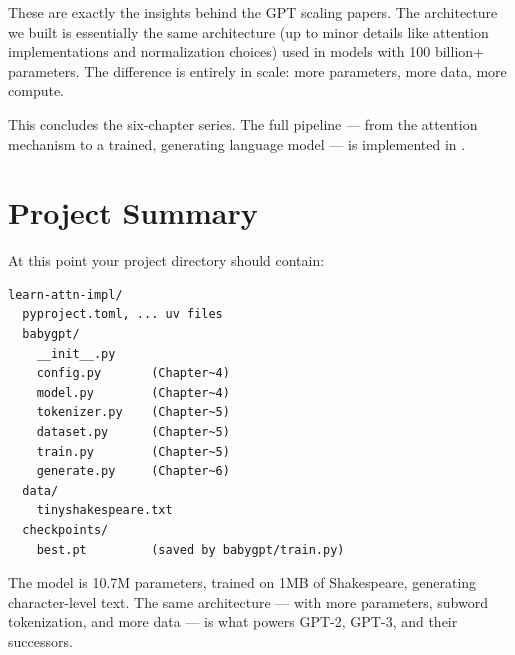 These are exactly the insights behind the GPT scaling papers. The architecture we built is essentially the same architecture (up to minor details like attention implementations and normalization choices) used in models with 100 billion+ parameters. The difference is entirely in scale: more parameters, more data, more compute.

\bigskip

This concludes the six-chapter series. The full pipeline --- from the attention mechanism to a trained, generating language model --- is implemented in .

\section{Project Summary}

At this point your project directory should contain:

\begin{verbatim}
learn-attn-impl/
  pyproject.toml, ... uv files
  babygpt/
    __init__.py
    config.py       (Chapter~4)
    model.py        (Chapter~4)
    tokenizer.py    (Chapter~5)
    dataset.py      (Chapter~5)
    train.py        (Chapter~5)
    generate.py     (Chapter~6)
  data/
    tinyshakespeare.txt
  checkpoints/
    best.pt         (saved by babygpt/train.py)
\end{verbatim}

The model is 10.7M parameters, trained on 1MB of Shakespeare, generating character-level text. The same architecture --- with more parameters, subword tokenization, and more data --- is what powers GPT-2, GPT-3, and their successors.
